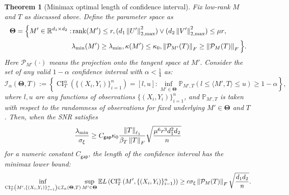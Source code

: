 \documentclass[12pt]{article}
\newcommand{\tF}{{\rm F}}
\newcommand{\norm}[1]{\left\lVert#1\right\rVert}
\newcommand{\R}{\mathbb{R}}
\newcommand{\cP}{\mathcal{P}}
\newcommand{\gap}{{\mathsf{gap} }}
\newtheorem{Theorem}{Theorem}
\theoremstyle{plain}
\begin{document}
\begin{sloppypar}
{\begin{Theorem}[Minimax optimal length of confidence interval]\label{thm:matrix-ci-minimax} 
Fix low-rank $M$ and $T$ as discussed above.
Define the parameter space as 
$$
\begin{aligned}
    \boldsymbol{\Theta}=\Big\{ M'\in\R^{d_1\times d_2}: &\operatorname{rank}(M')\le r, (d_1\norm{U'}_{2,\max}^2)\vee  (d_2\norm{V'}_{2,\max}^2)\le {\mu r},
    \\
    &\lambda_{\min}(M')\ge \lambda_{\min}, \kappa(M')\le \kappa_0,\norm{\cP_{M' }(T)}_{\tF}\ge \norm{\cP_{M }(T)}_{\tF} \Big\}.
\end{aligned}
$$
Here $\cP_{M'}(\cdot)$ means the projection onto the tangent space at $M'$. Consider the set of any valid $1-\alpha$ confidence interval  with $\alpha<\frac{1}{4}$ as:
$$
\mathcal{I}_\alpha(\boldsymbol{\Theta}, T):=\left\{\operatorname{CI}_{T}^\alpha\left( \{(X_i,Y_i)\}_{i=1}^n \right)=[l, u]: \inf _{M' \in \boldsymbol{\Theta}} \mathbb{P}_{M',T}(l \leq\langle M', T\rangle \leq u ) \geq 1-\alpha\right\},
$$
where $l, u$ are any functions of observations $\{(X_i,Y_i)\}_{i=1}^n$, and $\mathbb{P}_{M',T}$  is taken with respect to the randomness of observations for  fixed underlying $M'\in\boldsymbol{\Theta}$ and $T$. Then, when the SNR satisfies
\begin{equation*}
         \frac{\lambda_{\min}}{\sigma_{\xi}} \ge C_{\gap} \kappa_0\frac{\norm{T}_{\ell_1}}{ \beta_T\norm{T }_{\tF} }\sqrt{\frac{ \mu^{6} r^{3 }d_1^2d_2 }{ n } }
\end{equation*}
for a numeric constant $C_{\gap}$, the length of the confidence interval has the minimax lower bound:
\begin{equation*}
    \inf_{\operatorname{CI}_{T}^\alpha\left(M', \{(X_i,Y_i)\}_{i=1}^n \right) \in \mathcal{I}_\alpha(\boldsymbol{\Theta}, T) } \sup _{M'\in \boldsymbol{\Theta} } \mathbb{E} L\left(\operatorname{CI}_{T}^\alpha\left(M', \{(X_i,Y_i)\}_{i=1}^n \right)\right) \ge c\sigma_{\xi}  \norm{\cP_{M }(T)}_{\tF}\sqrt{\frac{d_1 d_2}{n}}.
\end{equation*}
\end{Theorem}


}
\end{sloppypar}
\end{document}
